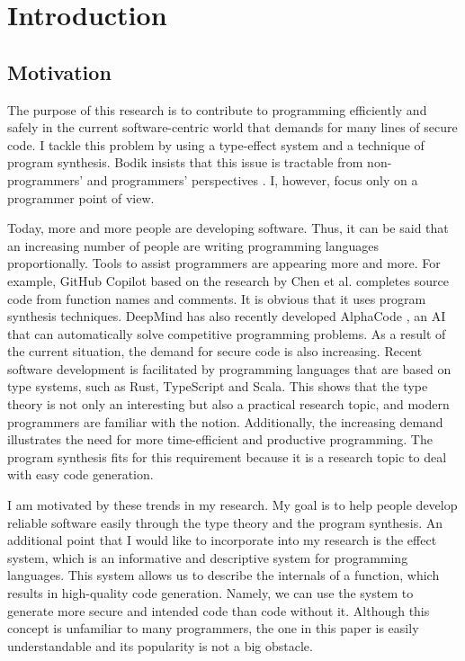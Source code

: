 \documentclass[12pt, a4paper, titlepage]{report}
\begin{document}
\chapter{Introduction}\label{chapter:introduction}
  \section{Motivation}
    The purpose of this research is to contribute to programming efficiently and safely in the current software-centric world that demands for many lines of secure code.
    I tackle this problem by using a type-effect system and a technique of program synthesis.
    Bodik insists that this issue is tractable from non-programmers' and programmers' perspectives \cite{bodik:2015}.
    I, however, focus only on a programmer point of view.

    Today, more and more people are developing software.
    Thus, it can be said that an increasing number of people are writing programming languages proportionally.
    Tools to assist programmers are appearing more and more.
    For example, GitHub Copilot based on the research by Chen et al. \cite{Chen:2021} completes source code from function names and comments.
    It is obvious that it uses program synthesis techniques.
    DeepMind has also recently developed AlphaCode \cite{Li:2022}, an AI that can automatically solve competitive programming problems.
    As a result of the current situation, the demand for secure code is also increasing.
    Recent software development is facilitated by programming languages that are based on type systems, such as Rust, TypeScript and Scala.
    This shows that the type theory is not only an interesting but also a practical research topic, and modern programmers are familiar with the notion.
    Additionally, the increasing demand illustrates the need for more time-efficient and productive programming.
    The program synthesis fits for this requirement because it is a research topic to deal with easy code generation.

    I am motivated by these trends in my research.
    My goal is to help people develop reliable software easily through the type theory and the program synthesis.
    An additional point that I would like to incorporate into my research is the effect system, which is an informative and descriptive system for programming languages.
    This system allows us to describe the internals of a function, which results in high-quality code generation.
    Namely, we can use the system to generate more secure and intended code than code without it.
    Although this concept is unfamiliar to many programmers, the one in this paper is easily understandable and its popularity is not a big obstacle.
\end{document}

